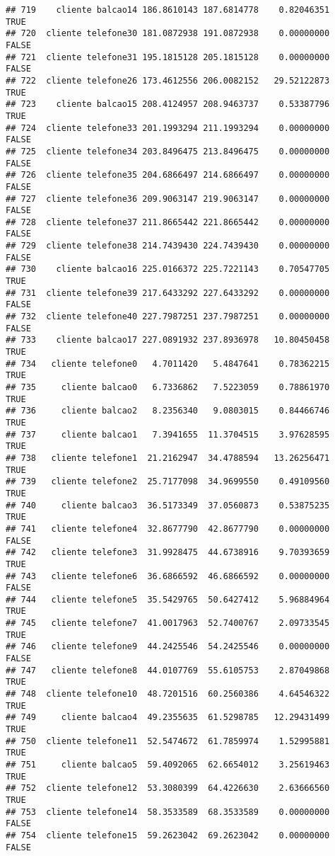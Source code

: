 \documentclass[
]{article}
\begin{document}
\begin{verbatim}
## 719    cliente balcao14 186.8610143 187.6814778    0.82046351     TRUE
## 720  cliente telefone30 181.0872938 191.0872938    0.00000000    FALSE
## 721  cliente telefone31 195.1815128 205.1815128    0.00000000    FALSE
## 722  cliente telefone26 173.4612556 206.0082152   29.52122873     TRUE
## 723    cliente balcao15 208.4124957 208.9463737    0.53387796     TRUE
## 724  cliente telefone33 201.1993294 211.1993294    0.00000000    FALSE
## 725  cliente telefone34 203.8496475 213.8496475    0.00000000    FALSE
## 726  cliente telefone35 204.6866497 214.6866497    0.00000000    FALSE
## 727  cliente telefone36 209.9063147 219.9063147    0.00000000    FALSE
## 728  cliente telefone37 211.8665442 221.8665442    0.00000000    FALSE
## 729  cliente telefone38 214.7439430 224.7439430    0.00000000    FALSE
## 730    cliente balcao16 225.0166372 225.7221143    0.70547705     TRUE
## 731  cliente telefone39 217.6433292 227.6433292    0.00000000    FALSE
## 732  cliente telefone40 227.7987251 237.7987251    0.00000000    FALSE
## 733    cliente balcao17 227.0891932 237.8936978   10.80450458     TRUE
## 734   cliente telefone0   4.7011420   5.4847641    0.78362215     TRUE
## 735     cliente balcao0   6.7336862   7.5223059    0.78861970     TRUE
## 736     cliente balcao2   8.2356340   9.0803015    0.84466746     TRUE
## 737     cliente balcao1   7.3941655  11.3704515    3.97628595     TRUE
## 738   cliente telefone1  21.2162947  34.4788594   13.26256471     TRUE
## 739   cliente telefone2  25.7177098  34.9699550    0.49109560     TRUE
## 740     cliente balcao3  36.5173349  37.0560873    0.53875235     TRUE
## 741   cliente telefone4  32.8677790  42.8677790    0.00000000    FALSE
## 742   cliente telefone3  31.9928475  44.6738916    9.70393659     TRUE
## 743   cliente telefone6  36.6866592  46.6866592    0.00000000    FALSE
## 744   cliente telefone5  35.5429765  50.6427412    5.96884964     TRUE
## 745   cliente telefone7  41.0017963  52.7400767    2.09733545     TRUE
## 746   cliente telefone9  44.2425546  54.2425546    0.00000000    FALSE
## 747   cliente telefone8  44.0107769  55.6105753    2.87049868     TRUE
## 748  cliente telefone10  48.7201516  60.2560386    4.64546322     TRUE
## 749     cliente balcao4  49.2355635  61.5298785   12.29431499     TRUE
## 750  cliente telefone11  52.5474672  61.7859974    1.52995881     TRUE
## 751     cliente balcao5  59.4092065  62.6654012    3.25619463     TRUE
## 752  cliente telefone12  53.3080399  64.4226630    2.63666560     TRUE
## 753  cliente telefone14  58.3533589  68.3533589    0.00000000    FALSE
## 754  cliente telefone15  59.2623042  69.2623042    0.00000000    FALSE

\end{verbatim}
\end{document}
